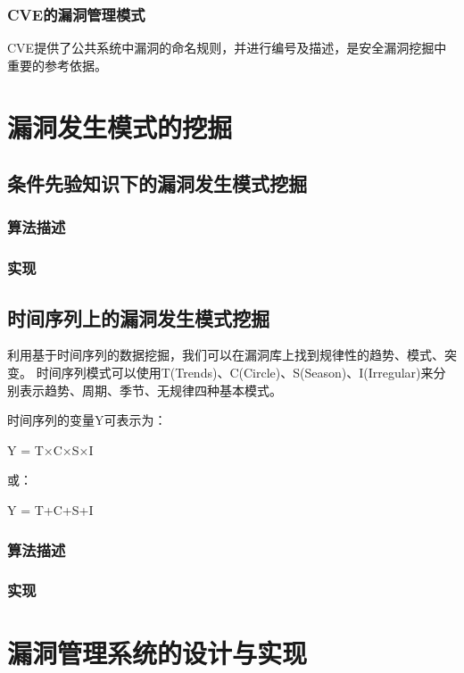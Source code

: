 \documentclass[a4paper]{ctexrep}
\begin{document}
			\subsection{CVE的漏洞管理模式}
			CVE提供了公共系统中漏洞的命名规则，并进行编号及描述，是安全漏洞挖掘中重要的参考依据。

	\chapter{漏洞发生模式的挖掘}
		\section{条件先验知识下的漏洞发生模式挖掘}
			\subsection{算法描述}
			\subsection{实现}
		\section{时间序列上的漏洞发生模式挖掘}
		利用基于时间序列的数据挖掘，我们可以在漏洞库上找到规律性的趋势、模式、突变。
		时间序列模式可以使用T(Trends)、C(Circle)、S(Season)、I(Irregular)来分别表示趋势、周期、季节、无规律四种基本模式。

		时间序列的变量Y可表示为：

		Y = T×C×S×I

		或：

		Y = T+C+S+I
			\subsection{算法描述}
			\subsection{实现}
	\chapter{漏洞管理系统的设计与实现}
\end{document}

